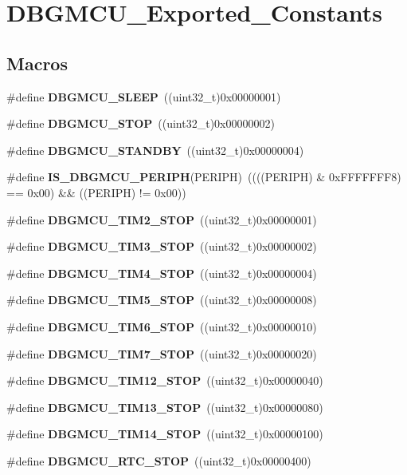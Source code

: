 \section{D\+B\+G\+M\+C\+U\+\_\+\+Exported\+\_\+\+Constants}
\label{group__DBGMCU__Exported__Constants}
\subsection*{Macros}
\begin{DoxyCompactItemize}
\item 
\#define \textbf{ D\+B\+G\+M\+C\+U\+\_\+\+S\+L\+E\+EP}~((uint32\+\_\+t)0x00000001)
\item 
\#define \textbf{ D\+B\+G\+M\+C\+U\+\_\+\+S\+T\+OP}~((uint32\+\_\+t)0x00000002)
\item 
\#define \textbf{ D\+B\+G\+M\+C\+U\+\_\+\+S\+T\+A\+N\+D\+BY}~((uint32\+\_\+t)0x00000004)
\item 
\#define \textbf{ I\+S\+\_\+\+D\+B\+G\+M\+C\+U\+\_\+\+P\+E\+R\+I\+PH}(P\+E\+R\+I\+PH)~((((P\+E\+R\+I\+PH) \& 0x\+F\+F\+F\+F\+F\+F\+F8) == 0x00) \&\& ((\+P\+E\+R\+I\+P\+H) != 0x00))
\item 
\#define \textbf{ D\+B\+G\+M\+C\+U\+\_\+\+T\+I\+M2\+\_\+\+S\+T\+OP}~((uint32\+\_\+t)0x00000001)
\item 
\#define \textbf{ D\+B\+G\+M\+C\+U\+\_\+\+T\+I\+M3\+\_\+\+S\+T\+OP}~((uint32\+\_\+t)0x00000002)
\item 
\#define \textbf{ D\+B\+G\+M\+C\+U\+\_\+\+T\+I\+M4\+\_\+\+S\+T\+OP}~((uint32\+\_\+t)0x00000004)
\item 
\#define \textbf{ D\+B\+G\+M\+C\+U\+\_\+\+T\+I\+M5\+\_\+\+S\+T\+OP}~((uint32\+\_\+t)0x00000008)
\item 
\#define \textbf{ D\+B\+G\+M\+C\+U\+\_\+\+T\+I\+M6\+\_\+\+S\+T\+OP}~((uint32\+\_\+t)0x00000010)
\item 
\#define \textbf{ D\+B\+G\+M\+C\+U\+\_\+\+T\+I\+M7\+\_\+\+S\+T\+OP}~((uint32\+\_\+t)0x00000020)
\item 
\#define \textbf{ D\+B\+G\+M\+C\+U\+\_\+\+T\+I\+M12\+\_\+\+S\+T\+OP}~((uint32\+\_\+t)0x00000040)
\item 
\#define \textbf{ D\+B\+G\+M\+C\+U\+\_\+\+T\+I\+M13\+\_\+\+S\+T\+OP}~((uint32\+\_\+t)0x00000080)
\item 
\#define \textbf{ D\+B\+G\+M\+C\+U\+\_\+\+T\+I\+M14\+\_\+\+S\+T\+OP}~((uint32\+\_\+t)0x00000100)
\item 
\#define \textbf{ D\+B\+G\+M\+C\+U\+\_\+\+R\+T\+C\+\_\+\+S\+T\+OP}~((uint32\+\_\+t)0x00000400)

\end{DoxyCompactItemize}
